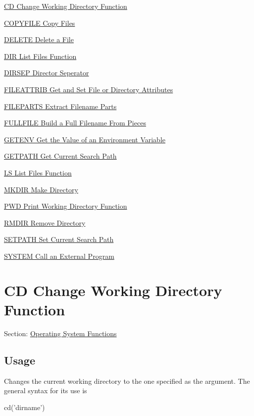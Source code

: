 
\begin{DoxyItemize}
\item \hyperlink{os_cd}{C\-D Change Working Directory Function}  
\item \hyperlink{os_copyfile}{C\-O\-P\-Y\-F\-I\-L\-E Copy Files}  
\item \hyperlink{os_delete}{D\-E\-L\-E\-T\-E Delete a File}  
\item \hyperlink{os_dir}{D\-I\-R List Files Function}  
\item \hyperlink{os_dirsep}{D\-I\-R\-S\-E\-P Director Seperator}  
\item \hyperlink{os_fileattrib}{F\-I\-L\-E\-A\-T\-T\-R\-I\-B Get and Set File or Directory Attributes}  
\item \hyperlink{os_fileparts}{F\-I\-L\-E\-P\-A\-R\-T\-S Extract Filename Parts}  
\item \hyperlink{os_fullfile}{F\-U\-L\-L\-F\-I\-L\-E Build a Full Filename From Pieces}  
\item \hyperlink{os_getenv}{G\-E\-T\-E\-N\-V Get the Value of an Environment Variable}  
\item \hyperlink{os_getpath}{G\-E\-T\-P\-A\-T\-H Get Current Search Path}  
\item \hyperlink{os_ls}{L\-S List Files Function}  
\item \hyperlink{os_mkdir}{M\-K\-D\-I\-R Make Directory}  
\item \hyperlink{os_pwd}{P\-W\-D Print Working Directory Function}  
\item \hyperlink{os_rmdir}{R\-M\-D\-I\-R Remove Directory}  
\item \hyperlink{os_setpath}{S\-E\-T\-P\-A\-T\-H Set Current Search Path}  
\item \hyperlink{os_system}{S\-Y\-S\-T\-E\-M Call an External Program}  
\end{DoxyItemize}\hypertarget{os_cd}{}\section{C\-D Change Working Directory Function}\label{os_cd}
Section\-: \hyperlink{sec_os}{Operating System Functions} \hypertarget{vtkwidgets_vtkxyplotwidget_Usage}{}\subsection{Usage}\label{vtkwidgets_vtkxyplotwidget_Usage}
Changes the current working directory to the one specified as the argument. The general syntax for its use is \begin{DoxyVerb}  cd('dirname')
\end{DoxyVerb}
